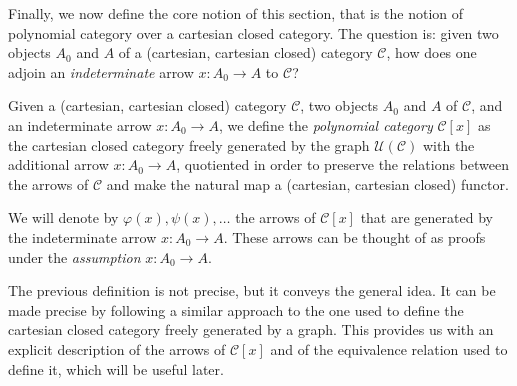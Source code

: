 Finally, we now define the core notion of this section, that is the notion of polynomial category over a cartesian closed category. The question is:
given two objects $A_0$ and $A$ of a (cartesian, cartesian closed) category $\mathcal C$, how does one adjoin an \emph{indeterminate} arrow $x : A_0 \to A$ to $\mathcal C$?

\begin{definition}
    Given a (cartesian, cartesian closed) category $\mathcal C$, two objects $A_0$ and $A$ of $\mathcal C$, and an indeterminate arrow $x : A_0 \to A$, we define the \emph{polynomial category} $\mathcal C[x]$
    as the cartesian closed category freely generated by the graph $\mathcal U(\mathcal C)$ with the additional arrow $x : A_0 \to A$, quotiented in order to preserve the relations between the arrows of $\mathcal C$ and make the natural map a (cartesian, cartesian closed) functor.
\end{definition}

\begin{notation}\label{idx:polynomial-arrows}
    We will denote by $\varphi(x), \psi(x), \ldots$ the arrows of $\mathcal C[x]$ that are generated by the indeterminate arrow $x : A_0 \to A$. These arrows
    can be thought of as proofs under the \emph{assumption} $x : A_0 \to A$.
\end{notation}

The previous definition is not precise, but it conveys the general idea. It can be made precise by following a similar approach to the one used to define the cartesian closed category freely generated by a graph.
This provides us with an explicit description of the arrows of $\mathcal C[x]$ and of the equivalence relation used to define it, which will be useful later.

